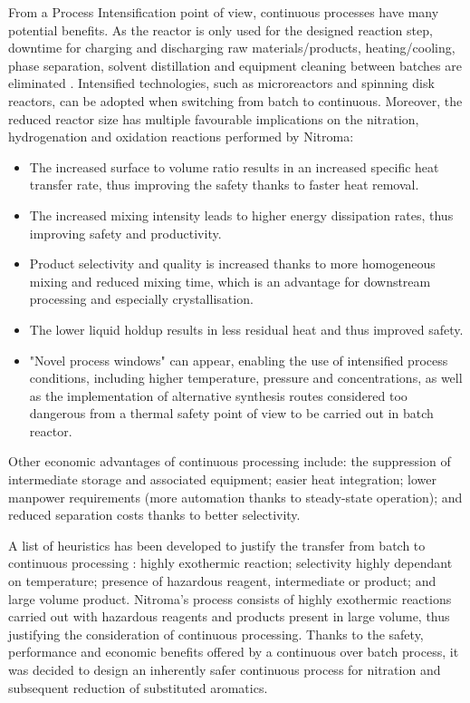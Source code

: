 From a Process Intensification point of view, continuous processes have many potential benefits. As the  reactor is only used for the designed reaction step, downtime for charging and discharging raw materials/products, heating/cooling, phase separation, solvent distillation and equipment cleaning between batches are eliminated \cite{randall_process_2020}. Intensified technologies, such as microreactors and spinning disk reactors, can be adopted when switching from batch to continuous. Moreover, the reduced reactor size has multiple favourable implications on the nitration, hydrogenation and oxidation reactions performed by Nitroma:
\begin{itemize}
    \item The increased surface to volume ratio results in an increased specific heat transfer rate, thus improving the safety thanks to faster heat removal.
    \item The increased mixing intensity leads to higher energy dissipation rates, thus improving safety and productivity.
    \item Product selectivity and quality is increased thanks to more homogeneous mixing and reduced mixing time, which is an advantage for downstream processing and especially crystallisation.
    \item The lower liquid holdup results in less residual heat and thus improved safety.
    \item "Novel process windows" can appear, enabling the use of intensified process conditions, including higher temperature, pressure and concentrations, as well as the implementation of alternative synthesis routes considered too dangerous from a thermal safety point of view to be carried out in batch reactor.
\end{itemize}
Other economic advantages of continuous processing include: the suppression of intermediate storage and associated equipment; easier heat integration; lower manpower requirements (more automation thanks to steady-state operation); and reduced separation costs thanks to better selectivity.

A list of heuristics has been developed to justify the transfer from batch to continuous processing \cite{randall_process_2020}: highly exothermic reaction; selectivity highly dependant on temperature; presence of hazardous reagent, intermediate or product; and large volume product.
Nitroma's process consists of highly exothermic reactions carried out with hazardous reagents and products present in large volume, thus justifying the consideration of continuous processing. Thanks to the safety, performance and economic benefits offered by a continuous over batch process, it was decided to design an inherently safer continuous process for nitration and subsequent reduction of substituted aromatics.

